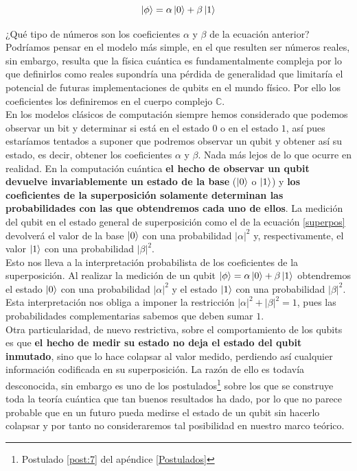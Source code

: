 \documentclass[11pt, spanish]{report}
\numberwithin{equation}{section}
\numberwithin{defin}{section}
\begin{document}
\begin{equation}\label{superpos}
\ket{\phi}=\alpha\ket{0}+\beta\ket{1}
\end{equation}

¿Qué tipo de números son los coeficientes $\alpha$ y $\beta$ de la ecuación anterior? Podríamos pensar en el modelo más simple, en el que resulten ser números reales, sin embargo, resulta que la física cuántica es fundamentalmente compleja por lo que definirlos como reales supondría una pérdida de generalidad que limitaría el potencial de futuras implementaciones de qubits en el mundo físico. Por ello los coeficientes los definiremos en el cuerpo complejo $\mathbb{C}$.\\

En los modelos clásicos de computación siempre hemos considerado que podemos observar un bit y determinar si está en el estado $0$ o en el estado $1$, así pues estaríamos tentados a suponer que podremos observar un qubit y obtener así su estado, es decir, obtener los coeficientes $\alpha$ y $\beta$. Nada más lejos de lo que ocurre en realidad. En la computación cuántica \textbf{el hecho de observar un qubit devuelve invariablemente un estado de la base} ($\ket{0}$ o $\ket{1}$) y \textbf{los coeficientes de la superposición solamente determinan las probabilidades con las que obtendremos cada uno de ellos}. La medición del qubit en el estado general de superposición como el de la ecuación \ref{superpos} devolverá el valor de la base $\ket{0}$ con una probabilidad $|\alpha|^2$ y, respectivamente, el valor $\ket{1}$ con una probabilidad $|\beta|^2$.\\

Esto nos lleva a la interpretación probabilista de los coeficientes de la superposición. Al realizar la medición de un qubit $\ket{\phi}=\alpha\ket{0}+\beta\ket{1}$ obtendremos el estado $\ket{0}$ con una probabilidad $|\alpha|^2$ y el estado $\ket{1}$ con una probabilidad $|\beta|^2$. Esta interpretación nos obliga a imponer la restricción $|\alpha|^2+|\beta|^2=1$, pues las probabilidades complementarias sabemos que deben sumar $1$.\\

Otra particularidad, de nuevo restrictiva, sobre el comportamiento de los qubits es que \textbf{el hecho de medir su estado no deja el estado del qubit inmutado}, sino que lo hace colapsar al valor medido, perdiendo así cualquier información codificada en su superposición. La razón de ello es todavía desconocida, sin embargo es uno de los postulados\footnote{Postulado \ref{post:7} del apéndice \ref{Postulados}} sobre los que se construye toda la teoría cuántica que tan buenos resultados ha dado, por lo que no parece probable que en un futuro pueda medirse el estado de un qubit sin hacerlo colapsar y por tanto no consideraremos tal posibilidad en nuestro marco teórico.\footnotemark{}\\
\end{document}
